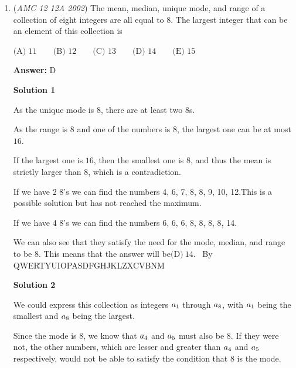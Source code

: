 \begin{enumerate}
 $\text{(A) }N<1 \qquad \text{(B) }N=1 \qquad \text{(C) }1<N<2 \qquad \text{(D) }N=2 \qquad \text{(E) }N>2$

 \textbf{Answer: }D



\textbf{Solution}

First, note that $2002 = 11 \cdot 13 \cdot 14$.

 Using the fact that for any base we have $\log a + \log b = \log ab$, we get that $N = \log_{2002} (11^2 \cdot 13^2 \cdot 14^2) = \log_{2002} 2002^2 = \boxed{(D) N=2}$.

 


	\item (\textit{AMC 12 12A 2002}) The mean, median, unique mode, and range of a collection of eight integers are all equal to 8. The largest integer that can be an element of this collection is 


 $\text{(A) }11 \qquad \text{(B) }12 \qquad \text{(C) }13 \qquad \text{(D) }14 \qquad \text{(E) }15$

 \textbf{Answer: }D



\textbf{Solution 1}

As the unique mode is $8$, there are at least two $8$s.

 As the range is $8$ and one of the numbers is $8$, the largest one can be at most $16$.

 If the largest one is $16$, then the smallest one is $8$, and thus the mean is strictly larger than $8$, which is a contradiction.

 If we have 2 8's we can find the numbers 4, 6, 7, 8, 8, 9, 10, 12.This is a possible solution but has not reached the maximum.

 If we have 4 8's we can find the numbers 6, 6, 6, 8, 8, 8, 8, 14.

 We can also see that they satisfy the need for the mode, median, and range to be 8. This means that the answer will be$\boxed{\text{(D)}\ 14 }$. ~By QWERTYUIOPASDFGHJKLZXCVBNM

 



\textbf{Solution 2}

We could express this collection as integers $a\textsubscript{1}$ through $a\textsubscript{8}$, with $a\textsubscript{1}$ being the smallest and $a\textsubscript{8}$ being the largest.

 Since the mode is $8$, we know that $a\textsubscript{4}$ and $a\textsubscript{5}$ must also be $8$. If they were not, the other numbers, which are lesser and greater than $a\textsubscript{4}$ and $a\textsubscript{5}$ respectively, would not be able to satisfy the condition that $8$ is the mode.


\end{enumerate}
